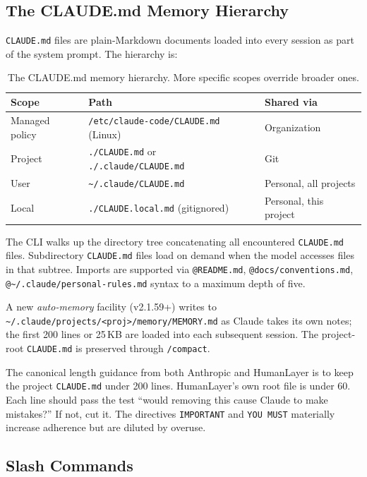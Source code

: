 \documentclass[11pt]{article}
\begin{document}
\subsection{The CLAUDE.md Memory Hierarchy}

\texttt{CLAUDE.md} files are plain-Markdown documents loaded into every session as part of the system prompt. The hierarchy is:

\begin{table}[h]
\centering
\small
\begin{tabular}{@{}lll@{}}
\toprule
\textbf{Scope} & \textbf{Path} & \textbf{Shared via} \\
\midrule
Managed policy & \texttt{/etc/claude-code/CLAUDE.md} (Linux) & Organization \\
Project & \texttt{./CLAUDE.md} or \texttt{./.claude/CLAUDE.md} & Git \\
User & \texttt{\textasciitilde/.claude/CLAUDE.md} & Personal, all projects \\
Local & \texttt{./CLAUDE.local.md} (gitignored) & Personal, this project \\
\bottomrule
\end{tabular}
\caption{The CLAUDE.md memory hierarchy. More specific scopes override broader ones.}
\end{table}

The CLI walks up the directory tree concatenating all encountered \texttt{CLAUDE.md} files. Subdirectory \texttt{CLAUDE.md} files load on demand when the model accesses files in that subtree. Imports are supported via \texttt{@README.md}, \texttt{@docs/conventions.md}, \texttt{@\textasciitilde/.claude/personal-rules.md} syntax to a maximum depth of five.

A new \emph{auto-memory} facility (v2.1.59+) writes to \texttt{\textasciitilde/.claude/projects/<proj>/memory/MEMORY.md} as Claude takes its own notes; the first 200 lines or 25\,KB are loaded into each subsequent session. The project-root \texttt{CLAUDE.md} is preserved through \texttt{/compact}.

The canonical length guidance from both Anthropic and HumanLayer is to keep the project \texttt{CLAUDE.md} under 200 lines. HumanLayer's own root file is under 60. Each line should pass the test ``would removing this cause Claude to make mistakes?'' If not, cut it. The directives \texttt{IMPORTANT} and \texttt{YOU MUST} materially increase adherence but are diluted by overuse.

\subsection{Slash Commands}
\end{document}
